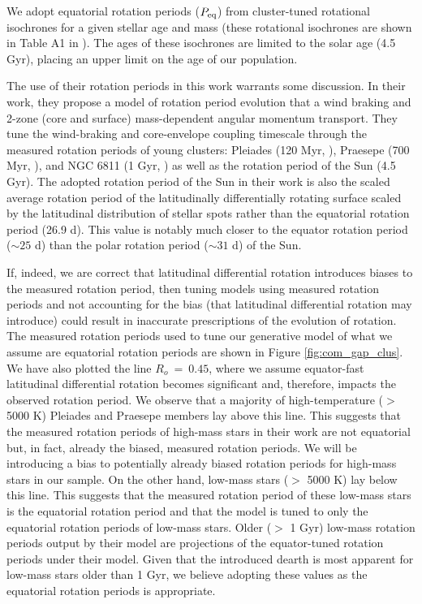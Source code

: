 We adopt equatorial rotation periods ($P_{\rm{eq}}$) from cluster-tuned rotational isochrones for a given stellar age and mass (these rotational isochrones are shown in Table A1 in \citet{spada_competing_2020}).
The ages of these isochrones are limited to the solar age (4.5 Gyr), placing an upper limit on the age of our population.

The use of their rotation periods in this work warrants some discussion.
In their work, they propose a model of rotation period evolution that a wind braking and 2-zone (core and surface) mass-dependent angular momentum transport.
They tune the wind-braking and core-envelope coupling timescale through the measured rotation periods of young clusters: Pleiades (120 Myr, \citep{rebull_rotation_2016}), Praesepe (700 Myr, \citep{douglas_poking_2017, douglas_k2_2019}), and NGC 6811 (1 Gyr, \citep{curtis_temporary_2019}) as well as the rotation period of the Sun (4.5 Gyr).
The adopted rotation period of the Sun in their work is also the scaled average rotation period of the latitudinally differentially rotating surface scaled by the latitudinal distribution of stellar spots rather than the equatorial rotation period (26.9 d).
This value is notably much closer to the equator rotation period ($\sim 25$ d) than the polar rotation period ($\sim 31$ d) of the Sun.

If, indeed, we are correct that latitudinal differential rotation introduces biases to the measured rotation period, then tuning models using measured rotation periods and not accounting for the bias (that latitudinal differential rotation may introduce) could result in inaccurate prescriptions of the evolution of rotation.
The measured rotation periods used to tune our generative model of what we assume are equatorial rotation periods are shown in Figure \ref{fig:com_gap_clus}.
We have also plotted the line $R_o \ = \ 0.45$, where we assume equator-fast latitudinal differential rotation becomes significant and, therefore, impacts the observed rotation period.
We observe that a majority of high-temperature ($>$ 5000 K) Pleiades and Praesepe members lay above this line.
This suggests that the measured rotation periods of high-mass stars in their work are not equatorial but, in fact, already the biased, measured rotation periods.
We will be introducing a bias to potentially already biased rotation periods for high-mass stars in our sample.
On the other hand, low-mass stars ($>$ 5000 K) lay below this line.
This suggests that the measured rotation period of these low-mass stars is the equatorial rotation period and that the model is tuned to only the equatorial rotation periods of low-mass stars.
Older ($>$ 1 Gyr) low-mass rotation periods output by their model are projections of the equator-tuned rotation periods under their model.
Given that the introduced dearth is most apparent for low-mass stars older than 1 Gyr, we believe adopting these values as the equatorial rotation periods is appropriate.

